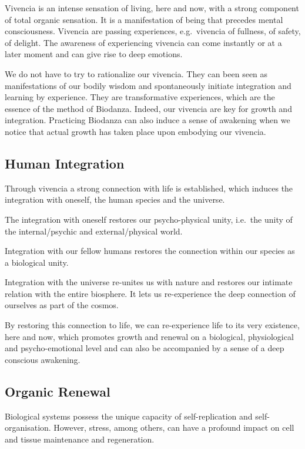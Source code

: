 \documentclass[
  11pt,
]{book}
\begin{document}
Vivencia is an intense sensation of living, here and now, with a strong component of total organic sensation. It is a manifestation of being that precedes mental consciousness. Vivencia are passing experiences, e.g.~vivencia of fullness, of safety, of delight. The awareness of experiencing vivencia can come instantly or at a later moment and can give rise to deep emotions.

We do not have to try to rationalize our vivencia. They can been seen as manifestations of our bodily wisdom and spontaneously initiate integration and learning by experience. They are transformative experiences, which are the essence of the method of Biodanza. Indeed, our vivencia are key for growth and integration. Practicing Biodanza can also induce a sense of awakening when we notice that actual growth has taken place upon embodying our vivencia.

\hypertarget{human-integration}{%
\subsection{Human Integration}\label{human-integration}}

Through vivencia a strong connection with life is established, which induces the integration with oneself, the human species and the universe.

The integration with oneself restores our psycho-physical unity, i.e.~the unity of the internal/psychic and external/physical world.

Integration with our fellow humans restores the connection within our species as a biological unity.

Integration with the universe re-unites us with nature and restores our intimate relation with the entire biosphere.
It lets us re-experience the deep connection of ourselves as part of the cosmos.

By restoring this connection to life, we can re-experience life to its very existence, here and now, which promotes growth and renewal on a biological, physiological and psycho-emotional level and can also be accompanied by a sense of a deep conscious awakening.

\hypertarget{organic-renewal}{%
\subsection{Organic Renewal}\label{organic-renewal}}

Biological systems possess the unique capacity of self-replication and self-organisation. However, stress, among others, can have a profound impact on cell and tissue maintenance and regeneration.
\end{document}

